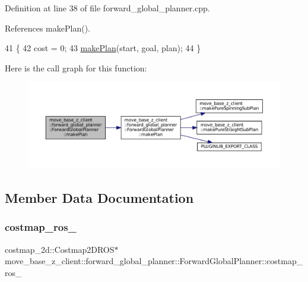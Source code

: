 Definition at line 38 of file forward\+\_\+global\+\_\+planner.\+cpp.



References make\+Plan().


\begin{DoxyCode}
41 \{
42     cost = 0;
43     \hyperlink{classmove__base__z__client_1_1forward__global__planner_1_1ForwardGlobalPlanner_a2dcf9aad74efaaa92ee78650f7a23096}{makePlan}(start, goal, plan);
44 \}
\end{DoxyCode}
Here is the call graph for this function\+:
\nopagebreak
\begin{figure}[H]
\begin{center}
\leavevmode
\includegraphics[width=350pt]{classmove__base__z__client_1_1forward__global__planner_1_1ForwardGlobalPlanner_a16f21fc4735c26535517678d29a6f1f3_cgraph}
\end{center}
\end{figure}


\subsection{Member Data Documentation}
\mbox{\label{classmove__base__z__client_1_1forward__global__planner_1_1ForwardGlobalPlanner_aba11d85f5f4c9370873195ca97497a22}} 
\subsubsection{\texorpdfstring{costmap\+\_\+ros\+\_\+}{costmap\_ros\_}}
{\footnotesize\ttfamily costmap\+\_\+2d\+::\+Costmap2\+D\+R\+OS$\ast$ move\+\_\+base\+\_\+z\+\_\+client\+::forward\+\_\+global\+\_\+planner\+::\+Forward\+Global\+Planner\+::costmap\+\_\+ros\+\_\+\hspace{0.3cm}{\ttfamily [private]}}



